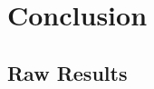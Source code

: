 \documentclass[a4paper,12pt,twocolumn]{article}
\begin{document}
\section{Conclusion}

\clearpage



\begin{appendices}
\section{Raw Results}


\end{appendices}
\end{document}
